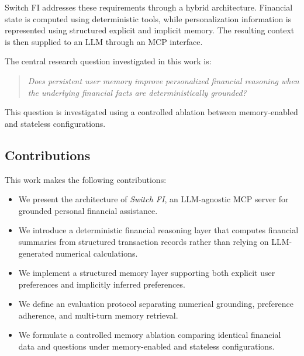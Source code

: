 \documentclass[conference]{IEEEtran}
\begin{document}
    Switch FI addresses these requirements through a hybrid architecture.
    Financial state is computed using deterministic tools, while
    personalization information is represented using structured explicit and
    implicit memory. The resulting context is then supplied to an LLM through
    an MCP interface.
    
    The central research question investigated in this work is:
    
    \begin{quote}
    \textit{Does persistent user memory improve personalized financial
    reasoning when the underlying financial facts are deterministically
    grounded?}
    \end{quote}
    
    This question is investigated using a controlled ablation between
    memory-enabled and stateless configurations.
    
    \subsection{Contributions}
    
    This work makes the following contributions:
    
    \begin{itemize}
    
        \item We present the architecture of \textit{Switch FI}, an
        LLM-agnostic MCP server for grounded personal financial assistance.
    
        \item We introduce a deterministic financial reasoning layer that
        computes financial summaries from structured transaction records
        rather than relying on LLM-generated numerical calculations.
    
        \item We implement a structured memory layer supporting both
        explicit user preferences and implicitly inferred preferences.
    
        \item We define an evaluation protocol separating numerical
        grounding, preference adherence, and multi-turn memory retrieval.
    
        \item We formulate a controlled memory ablation comparing identical
        financial data and questions under memory-enabled and stateless
        configurations.
    
    \end{itemize}
    
\end{document}
